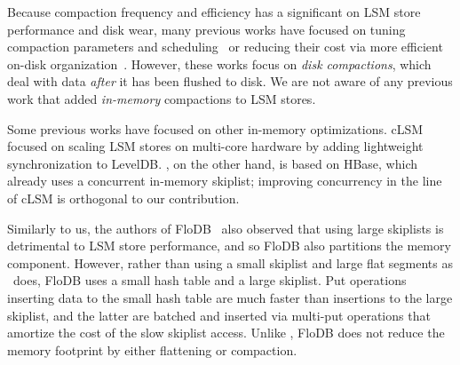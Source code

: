 





Because compaction frequency and efficiency has a significant on LSM store performance and disk wear, 
many previous works have focused on tuning compaction parameters and scheduling~\cite{hbasetuning,rocksdb,
scylladbcompaction,universalcompaction,Sears:2012} or reducing their cost via more efficient on-disk organization~\cite{wisckey}. 
However, these works focus on \emph{disk compactions},
which deal with data \emph{after} it has been flushed to disk. We are not aware of any previous work that 
added \emph{in-memory} compactions to LSM stores.

Some previous works have focused on other in-memory optimizations. 
cLSM~\cite{clsm} focused on scaling LSM stores on multi-core hardware by adding lightweight synchronization to LevelDB. 
\sys, on the other hand, is based on HBase, which already uses a concurrent in-memory skiplist; improving concurrency
in the line of cLSM is orthogonal to our contribution.  


Similarly to us, the authors of FloDB~\cite{flodb} also observed that using large skiplists is detrimental to 
LSM store performance, and so FloDB also partitions the memory component. However, rather than using 
a small skiplist and large flat segments as \sys\ does, FloDB  uses a small hash table and a large skiplist.
Put operations inserting data to the small hash table are much faster than insertions to the large skiplist, 
and the latter are batched and inserted via multi-put operations that amortize the cost of the slow skiplist access.
Unlike \sys, FloDB does not reduce the memory footprint by either flattening or compaction. 

